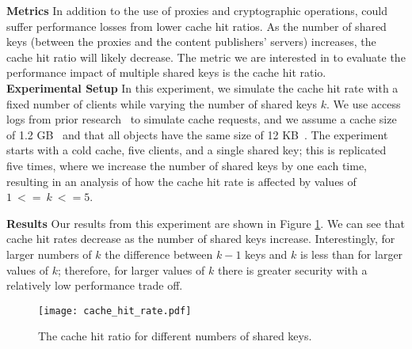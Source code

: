 {\bf Metrics}
In addition to the use of proxies and cryptographic operations, \system{} could suffer performance losses from lower cache hit ratios.  As the number 
of shared keys (between the proxies and the content publishers' servers) increases, the cache hit ratio will likely decrease.  The metric we are interested 
in to evaluate the performance impact of multiple shared keys is the cache hit ratio.\\

{\bf Experimental Setup}
In this experiment, we simulate the cache hit rate with a fixed number of clients while varying the number of shared keys $k$.  We use 
access logs from prior research~\cite{andersen2005improving} to simulate cache requests, and we assume a cache size of 1.2 GB~\cite{berger2017adaptsize} and that all objects have 
the same size of 12 KB~\cite{berger2016achieving}.  The experiment starts with a cold cache, five clients, and a single shared key; this is 
replicated five times, where we increase the number of shared keys by one each time, resulting in an analysis of how the cache hit rate is affected 
by values of $1~<=~k~<= 5$.

{\bf Results}
Our results from this experiment are shown in Figure \ref{fig:cache_hits}.  We can see that cache hit rates decrease 
as the number of shared keys increase.  Interestingly, for larger numbers of $k$ the difference between $k-1$ keys and $k$ is less than for larger 
values of $k$; therefore, for larger values of $k$ there is greater security with a relatively low performance trade off.

\begin{figure}[t]
\centering
\texttt{[image: cache\_hit\_rate.pdf]}
\caption{The cache hit ratio for different numbers of shared keys.}
\label{fig:cache_hits}
\end{figure}
